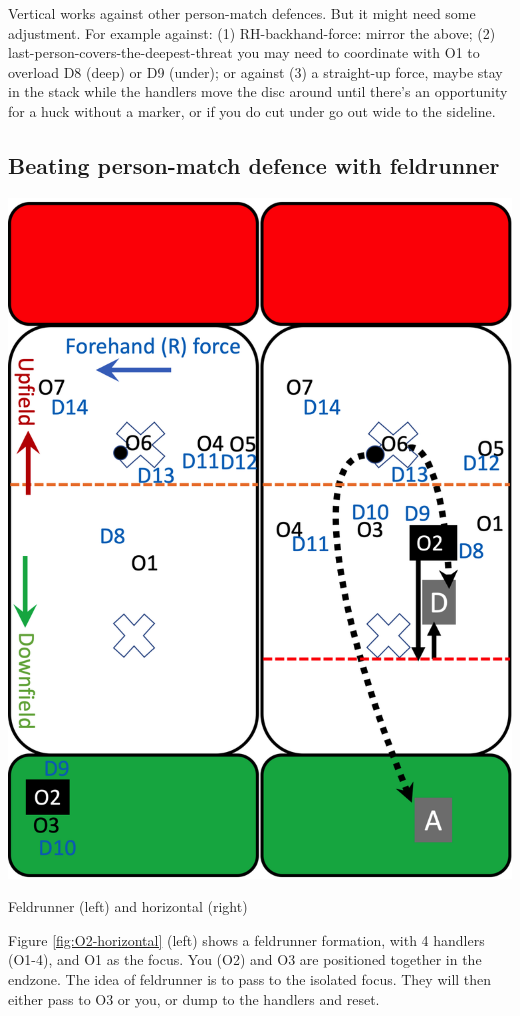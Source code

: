 \documentclass{tufte-handout}
\begin{document}
Vertical works
against other person-match defences. 
But it might need 
some adjustment.
For example
against: (1) RH-backhand-force: mirror the above; 
(2) last-person-covers-the-deepest-threat
you may need to coordinate with O1 
to overload D8 (deep) 
or D9 (under); or
against (3) a straight-up force, 
maybe stay in the stack 
while the handlers move the disc around
until there's an opportunity
for a huck without a marker, 
or if you do cut under 
go out wide 
to the sideline. 


\subsection{Beating person-match defence with feldrunner}
\label{sec:feld}
\begin{marginfigure}%
  \includegraphics[width=\linewidth]{O2-horizontal}
  \caption{Feldrunner (left) and horizontal (right)}
  \label{fig:O2-horizontal}
\end{marginfigure}
Figure \ref{fig:O2-horizontal} (left) 
shows a feldrunner formation, 
with 4 handlers (O1-4), 
and O1 as the focus.
You  
(O2) 
and O3
are positioned 
together in the endzone.
The idea of feldrunner 
is to pass to 
the isolated
focus. 
They will then either pass to 
O3 or you, 
or dump to the handlers
and reset. 
\end{document}
